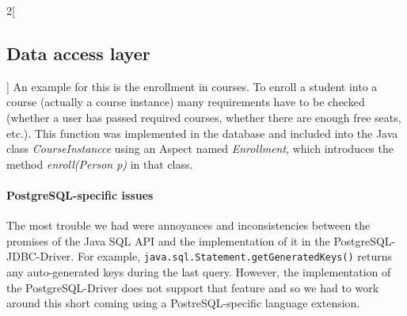 \begin{multicols}{2}[\subsection{Data access layer}]
An example for this is the enrollment in courses. To enroll a student into a course (actually a course instance) many requirements have to be checked (whether a user has passed required courses, whether there are enough free seats, etc.). This function was implemented in the database and included into the Java class \emph{CourseInstancce} using an Aspect named \emph{Enrollment}, which introduces the method \emph{enroll(Person p)} in that class.

\paragraph{PostgreSQL-specific issues} The most trouble we had were annoyances and inconsistencies between the promises of the Java SQL API and the implementation of it in the PostgreSQL-JDBC-Driver. For example, \texttt{java.sql.Statement.getGeneratedKeys()} returns any auto-generated keys during the last query. However, the implementation of the PostgreSQL-Driver does not support that feature and so we had to work around this short coming using a PostreSQL-specific language extension.


\end{multicols}
